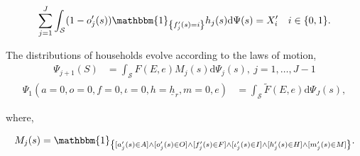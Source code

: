 \documentclass[parskip=full]{article}
\newcommand{\indicator}[1]{\mathbbm{1}_{\left\{ {#1} \right\} }}
\begin{document}
\begin{equation}
\label{eq:rental_housing_clearing_condition}
  \sum_{j=1}^J \int_\mathcal{S} (1-o'_{j}(s))\indicator{f'_{j}(s)=i}h_{j}(s) \mathrm{d}\Psi(s) = X'_{i} \quad i \in \{0,1\}.
\end{equation}

The distributions of households evolve according to the laws of motion,
\begin{align}
\Psi_{j+1}(S) &=\int_{\mathcal{S}} F(E,e)M_{j}(s)\mathrm{d}\Psi_{j}(s),\ j=1,\ldots,J-1\label{eq:lom1}
\end{align}
\begin{align}
\Psi_{1}(a=0,o=0,f=0,\iota=0,h=\underline{h}_{r},m=0,e) &=\int_{\mathcal{S}}\tilde{F}(E,e) \mathrm{d}\Psi_{J}(s),\label{eq:lom2}
\end{align}

\noindent where,

\begin{align}
    M_{j}(s) = \indicator{[a'_{j}(s)\in A] \land [o'_{j}(s)\in O] \land [f'_{j}(s)\in F] \land [\iota'_{j}(s)\in I] \land [h'_{j}(s) \in H] \land [m'_{j}(s) \in M]}.\notag
\end{align}
\end{document}
